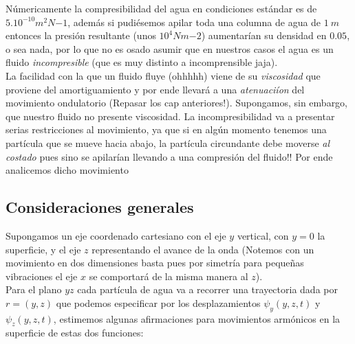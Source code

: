 \documentclass[a4paper,spanish]{article}
\numberwithin{equation}{section}
\begin{document}
N\'umericamente la compresibilidad del agua en condiciones est\'andar es de $5.10^{-10} m^2 N{-1}$, adem\'as si pudi\'esemos apilar toda una columna de agua de $1 \ m$ entonces la presi\'on resultante (unos $10^4 N m{-2}$) aumentar\'ian su densidad en $0.05 $, o sea nada, por lo que no es osado asumir que en nuestros casos el agua es un fluido \textit{incompresible} (que es muy distinto a incomprensible jaja).\\
La facilidad con la que un fluido fluye (ohhhhh) viene de su \textit{viscosidad} que proviene del amortiguamiento y por ende llevar\'a a una \textit{atenuaci\'ion} del movimiento ondulatorio (Repasar los cap anteriores!). Supongamos, sin embargo, que nuestro fluido no presente viscosidad. La incompresibilidad va a presentar serias restricciones al movimiento, ya que si en alg\'un momento tenemos una part\'icula que se mueve hacia abajo, la part\'icula circundante debe moverse \textit{al costado} pues sino se apilar\'ian llevando a una compresi\'on del fluido!! Por ende analicemos dicho movimiento

\subsection{Consideraciones generales}
Supongamos un eje coordenado cartesiano con el eje $y$ vertical, con $y=0$ la superficie, y el eje $z$ representando el avance de la onda (Notemos con un movimiento en dos dimensiones basta pues por simetr\'ia para peque\~nas vibraciones el eje $x$ se comportar\'a de la misma manera al $z$).\\
Para el plano $yz$ cada part\'icula de agua va a recorrer una trayectoria dada por $r=(y,z)$ que podemos especificar por los desplazamientos $\psi_y(y,z,t)$ y $\psi_z(y,z,t)$, estimemos algunas afirmaciones para movimientos arm\'onicos en la superficie de estas dos funciones:
\end{document}
